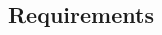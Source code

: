 \documentclass[12pt]{article}
\begin{document}
\begin{myspace}{1.7}
%
%
\pagebreak
\section*{Requirements}  

%
%


\end{myspace}
\end{document}
